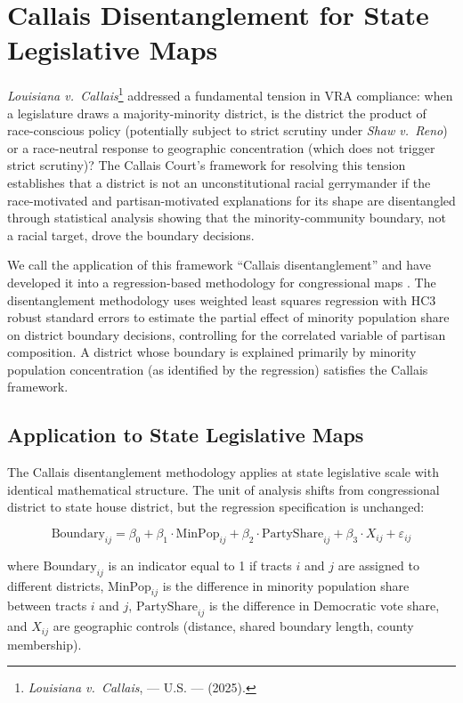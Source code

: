 \section{Callais Disentanglement for State Legislative Maps}
\label{sec:callais}

\textit{Louisiana v.\ Callais}\footnote{\textit{Louisiana v.\ Callais}, --- U.S. --- (2025).} addressed a fundamental tension in VRA compliance: when a legislature draws a majority-minority district, is the district the product of race-conscious policy (potentially subject to strict scrutiny under \textit{Shaw v.\ Reno}) or a race-neutral response to geographic concentration (which does not trigger strict scrutiny)? The Callais Court's framework for resolving this tension establishes that a district is not an unconstitutional racial gerrymander if the race-motivated and partisan-motivated explanations for its shape are disentangled through statistical analysis showing that the minority-community boundary, not a racial target, drove the boundary decisions.

We call the application of this framework ``Callais disentanglement'' and have developed it into a regression-based methodology for congressional maps \citep{dellaLibera2026callais}. The disentanglement methodology uses weighted least squares regression with HC3 robust standard errors to estimate the partial effect of minority population share on district boundary decisions, controlling for the correlated variable of partisan composition. A district whose boundary is explained primarily by minority population concentration (as identified by the regression) satisfies the Callais framework.

\subsection{Application to State Legislative Maps}

The Callais disentanglement methodology applies at state legislative scale with identical mathematical structure. The unit of analysis shifts from congressional district to state house district, but the regression specification is unchanged:

\begin{equation}
  \text{Boundary}_{ij} = \beta_0 + \beta_1 \cdot \text{MinPop}_{ij} + \beta_2 \cdot \text{PartyShare}_{ij} + \beta_3 \cdot X_{ij} + \varepsilon_{ij}
  \label{eq:callais}
\end{equation}

\noindent where $\text{Boundary}_{ij}$ is an indicator equal to 1 if tracts $i$ and $j$ are assigned to different districts, $\text{MinPop}_{ij}$ is the difference in minority population share between tracts $i$ and $j$, $\text{PartyShare}_{ij}$ is the difference in Democratic vote share, and $X_{ij}$ are geographic controls (distance, shared boundary length, county membership).

